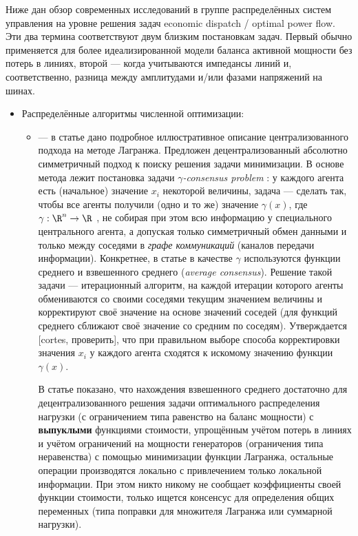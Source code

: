 Ниже дан обзор современных исследований в группе распределённых систем управления на уровне решения задач economic dispatch / optimal power flow. 
Эти два термина соответствуют двум близким постановкам задач. 
Первый обычно применяется для более идеализированной модели баланса активной мощности без потерь в линиях, второй --- когда учитываются импедансы линий и, соответственно, разница между амплитудами и/или фазами напряжений на шинах. 
\begin{itemize}
\item Распределённые алгоритмы численной оптимизации:
\begin{itemize}
\item \cite{loia2013decentralized} --- в статье дано подробное иллюстративное описание централизованного подхода на методе Лагранжа. 
Предложен децентрализованный абсолютно симметричный подход к поиску решения задачи минимизации.
В основе метода лежит постановка задачи \textit{$\gamma$-consensus problem} : у каждого агента есть (начальное) значение $x_i$ некоторой величины, задача ---  сделать так, чтобы все агенты получили (одно и то же) значение $\gamma(x)$, где $\gamma :\R^n \rightarrow \R$ , не собирая при этом всю информацию у специального центрального агента, а допуская только симметричный обмен данными и только между соседями в \textit{графе коммуникаций} (каналов передачи информации).
Конкретнее, в статье в качестве $\gamma$ используются функции среднего и взвешенного среднего (\textit{average consensus}).
Решение такой задачи --- итерационный алгоритм, на каждой итерации которого агенты обмениваются со своими соседями текущим значением величины и корректируют своё значение на основе значений соседей (для функций среднего сближают своё значение со средним по соседям).
Утверждается [cortes, проверить], что при правильном выборе способа корректировки значения $x_i$ у каждого агента сходятся к искомому значению функции $\gamma(x)$.

В статье показано, что нахождения взвешенного среднего достаточно для децентрализованного решения задачи оптимального распределения нагрузки (с ограничением типа равенство на баланс мощности) с \textbf{выпуклыми} функциями стоимости, упрощённым учётом потерь в линиях и учётом ограничений на мощности генераторов (ограничения типа неравенства) с помощью минимизации функции Лагранжа, остальные операции производятся локально с привлечением только локальной информации.
При этом никто никому не сообщает коэффициенты своей функции стоимости, только ищется консенсус для определения общих переменных (типа поправки для множителя Лагранжа или суммарной нагрузки).


\end{itemize}
\end{itemize}
